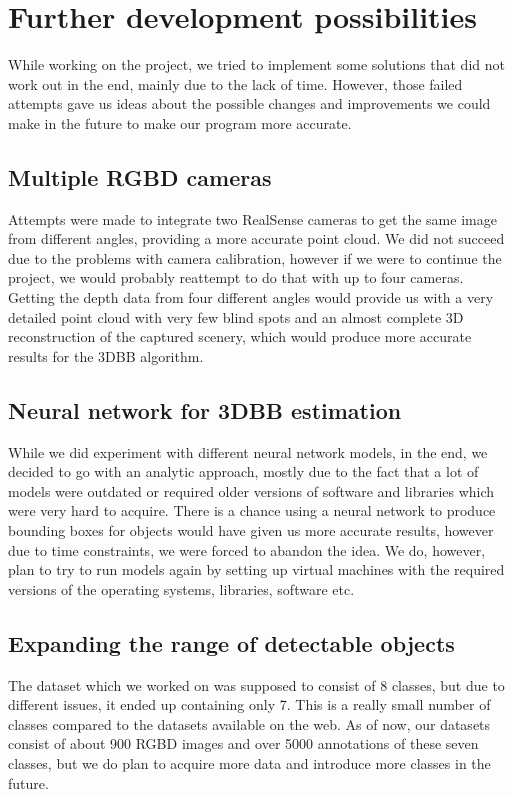 \chapter{Further development possibilities}
While working on the project, we tried to implement some solutions that did not work out in the end, mainly due to the lack of time. However, those failed attempts gave us ideas about the possible changes and improvements we could make in the future to make our program more accurate.

\section{Multiple RGBD cameras}
Attempts were made to integrate two RealSense cameras to get the same image from different angles, providing a more accurate point cloud. We did not succeed due to the problems with camera calibration, however if we were to continue the project, we would probably reattempt to do that with up to four cameras. Getting the depth data from four different angles would provide us with a very detailed point cloud with very few blind spots and an almost complete 3D reconstruction of the captured scenery, which would produce more accurate results for the 3DBB algorithm.

\section{Neural network for 3DBB estimation}
While we did experiment with different neural network models, in the end, we decided to go with an analytic approach, mostly due to the fact that a lot of models were outdated or required older versions of software and libraries which were very hard to acquire. There is a chance using a neural network to produce bounding boxes for objects would have given us more accurate results, however due to time constraints, we were forced to abandon the idea. We do, however, plan to try to run models again by setting up virtual machines with the required versions of the operating systems, libraries, software etc.

\section{Expanding the range of detectable objects}
The dataset which we worked on was supposed to consist of 8 classes, but due to different issues, it ended up containing only 7. This is a really small number of classes compared to the datasets available on the web. As of now, our datasets consist of about 900 RGBD images and over 5000 annotations of these seven classes, but we do plan to acquire more data and introduce more classes in the future.

